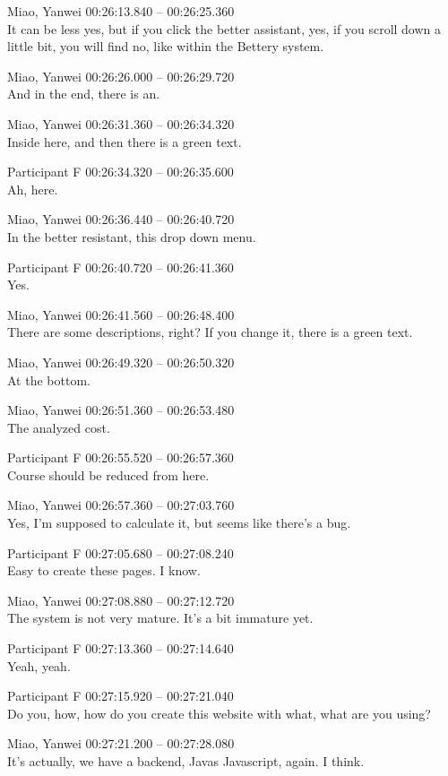 {Miao, Yanwei 00:26:13.840 -- 00:26:25.360 \\
It can be less yes, but if you click the better assistant, yes, if you scroll down a little bit, you will find no, like within the Bettery system.

Miao, Yanwei 00:26:26.000 -- 00:26:29.720 \\
And in the end, there is an.

Miao, Yanwei 00:26:31.360 -- 00:26:34.320 \\
Inside here, and then there is a green text.

Participant F 00:26:34.320 -- 00:26:35.600 \\
Ah, here.

Miao, Yanwei 00:26:36.440 -- 00:26:40.720 \\
In the better resistant, this drop down menu.

Participant F 00:26:40.720 -- 00:26:41.360 \\
Yes.

Miao, Yanwei 00:26:41.560 -- 00:26:48.400 \\
There are some descriptions, right? If you change it, there is a green text.

Miao, Yanwei 00:26:49.320 -- 00:26:50.320 \\
At the bottom.

Miao, Yanwei 00:26:51.360 -- 00:26:53.480 \\
The analyzed cost.

Participant F 00:26:55.520 -- 00:26:57.360 \\
Course should be reduced from here.

Miao, Yanwei 00:26:57.360 -- 00:27:03.760 \\
Yes, I'm supposed to calculate it, but seems like there's a bug.

Participant F 00:27:05.680 -- 00:27:08.240 \\
Easy to create these pages. I know.

Miao, Yanwei 00:27:08.880 -- 00:27:12.720 \\
The system is not very mature. It's a bit immature yet.

Participant F 00:27:13.360 -- 00:27:14.640 \\
Yeah, yeah.

Participant F 00:27:15.920 -- 00:27:21.040 \\
Do you, how, how do you create this website with what, what are you using?

Miao, Yanwei 00:27:21.200 -- 00:27:28.080 \\
It's actually, we have a backend, Javas Javascript, again. I think.

}
